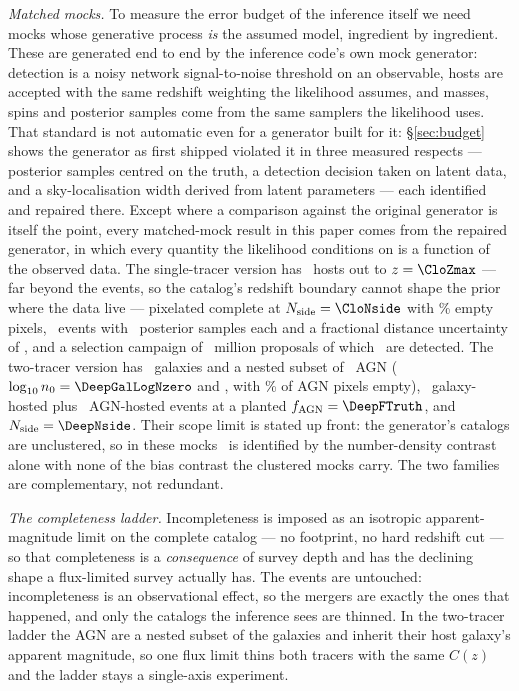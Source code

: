 \emph{Matched mocks.} To measure the error budget of the inference itself we
need mocks whose generative process \emph{is} the assumed model, ingredient by
ingredient. These are generated end to end by the inference code's own mock
generator: detection is a noisy network signal-to-noise threshold on an
observable, hosts are accepted with the same redshift weighting the likelihood
assumes, and masses, spins and posterior samples come from the same samplers the
likelihood uses. That standard is not automatic even for a generator built for
it: \S\ref{sec:budget} shows the generator as first shipped violated it in
three measured respects --- posterior samples centred on the truth, a
detection decision taken on latent data, and a sky-localisation width derived
from latent parameters --- each identified and repaired there. Except where a
comparison against the original generator is itself the point, every
matched-mock result in this paper comes from the repaired generator, in which
every quantity the likelihood conditions on is a function of the observed
data. The single-tracer version has \CloNhosts\ hosts out to
$z = \CloZmax$ --- far beyond the events, so the catalog's redshift boundary
cannot shape the prior where the data live --- pixelated complete at
$N_{\rm side} = \CloNside$ with \CloEmptyPix\% empty pixels, \CloNobs\ events
with \CloNsamp\ posterior samples each and a fractional distance uncertainty of
\CloSeedSigmaDl, and a selection campaign of \CloInjNdraw\ million proposals of
which \CloInjNdet\ are detected. The two-tracer version has \DeepNgalHosts\
galaxies and a nested subset of \DeepNagnHosts\ AGN
($\log_{10} n_0 = \DeepGalLogNzero$ and \DeepAgnLogNzero, with
\DeepAgnEmpty\% of AGN pixels empty), \DeepNgalEvents\ galaxy-hosted plus
\DeepNagnEvents\ AGN-hosted events at a planted $\fagn = \DeepFTruth$, and
$N_{\rm side} = \DeepNside$. Their scope limit is stated up front: the
generator's catalogs are unclustered, so in these mocks \fagn\ is identified by
the number-density contrast alone with none of the bias contrast the clustered
mocks carry. The two families are complementary, not redundant.

\emph{The completeness ladder.} Incompleteness is imposed as an isotropic
apparent-magnitude limit on the complete catalog --- no footprint, no hard
redshift cut --- so that completeness is a \emph{consequence} of survey depth
and has the declining shape a flux-limited survey actually has. The events are
untouched: incompleteness is an observational effect, so the mergers are exactly
the ones that happened, and only the catalogs the inference sees are thinned. In
the two-tracer ladder the AGN are a nested subset of the galaxies and inherit
their host galaxy's apparent magnitude, so one flux limit thins both tracers
with the same $C(z)$ and the ladder stays a single-axis experiment.

